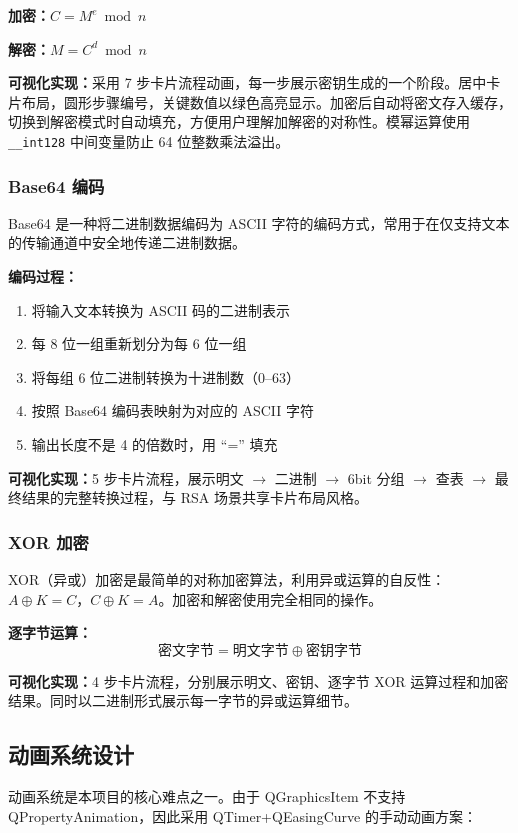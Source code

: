 \documentclass[a4paper,UTF8]{ctexart}
\begin{document}
\textbf{加密：}$C = M^e \bmod n$

\textbf{解密：}$M = C^d \bmod n$

\textbf{可视化实现：}采用 7 步卡片流程动画，每一步展示密钥生成的一个阶段。居中卡片布局，圆形步骤编号，关键数值以绿色高亮显示。加密后自动将密文存入缓存，切换到解密模式时自动填充，方便用户理解加解密的对称性。模幂运算使用 \texttt{\_\_int128} 中间变量防止 64 位整数乘法溢出。

\subsubsection{Base64 编码}

Base64 是一种将二进制数据编码为 ASCII 字符的编码方式，常用于在仅支持文本的传输通道中安全地传递二进制数据。

\textbf{编码过程：}
\begin{enumerate}
  \item 将输入文本转换为 ASCII 码的二进制表示
  \item 每 8 位一组重新划分为每 6 位一组
  \item 将每组 6 位二进制转换为十进制数（0--63）
  \item 按照 Base64 编码表映射为对应的 ASCII 字符
  \item 输出长度不是 4 的倍数时，用 ``='' 填充
\end{enumerate}

\textbf{可视化实现：}5 步卡片流程，展示明文 $\to$ 二进制 $\to$ 6bit 分组 $\to$ 查表 $\to$ 最终结果的完整转换过程，与 RSA 场景共享卡片布局风格。

\subsubsection{XOR 加密}

XOR（异或）加密是最简单的对称加密算法，利用异或运算的自反性：$A \oplus K = C$，$C \oplus K = A$。加密和解密使用完全相同的操作。

\textbf{逐字节运算：}
\[
  \text{密文字节} = \text{明文字节} \oplus \text{密钥字节}
\]

\textbf{可视化实现：}4 步卡片流程，分别展示明文、密钥、逐字节 XOR 运算过程和加密结果。同时以二进制形式展示每一字节的异或运算细节。

\subsection{动画系统设计}

动画系统是本项目的核心难点之一。由于 QGraphicsItem 不支持 QPropertyAnimation，因此采用 QTimer\;+\;QEasingCurve 的手动动画方案：
\end{document}
